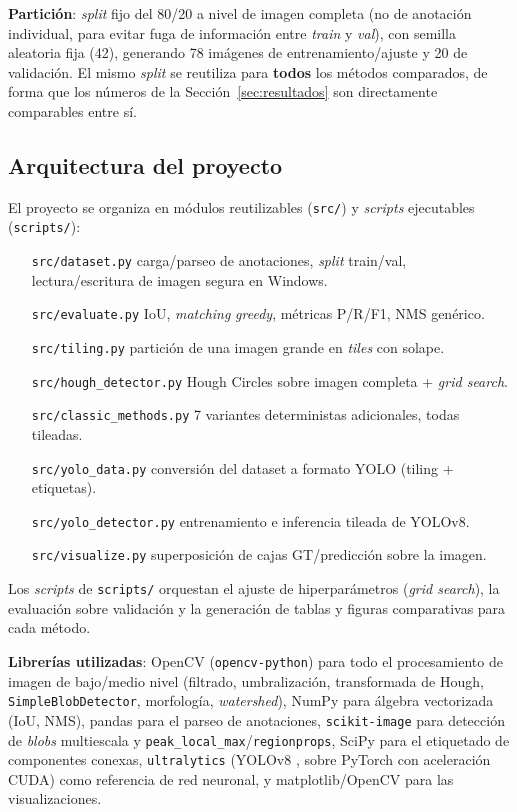 \documentclass[11pt,a4paper]{article}
\begin{document}
\textbf{Partición}: \emph{split} fijo del 80/20 a nivel de imagen completa (no de
anotación individual, para evitar fuga de información entre \emph{train} y
\emph{val}), con semilla aleatoria fija (42), generando 78 imágenes de
entrenamiento/ajuste y 20 de validación. El mismo \emph{split} se reutiliza para
\textbf{todos} los métodos comparados, de forma que los números de la
Sección~\ref{sec:resultados} son directamente comparables entre sí.

\subsection{Arquitectura del proyecto}

El proyecto se organiza en módulos reutilizables (\texttt{src/}) y \emph{scripts}
ejecutables (\texttt{scripts/}):

\begin{itemize}[leftmargin=2.2cm]
    \item[\texttt{src/dataset.py}] carga/parseo de anotaciones, \emph{split}
    train/val, lectura/escritura de imagen segura en Windows.
    \item[\texttt{src/evaluate.py}] IoU, \emph{matching} \emph{greedy}, métricas
    P/R/F1, NMS genérico.
    \item[\texttt{src/tiling.py}] partición de una imagen grande en \emph{tiles} con
    solape.
    \item[\texttt{src/hough\_detector.py}] Hough Circles sobre imagen completa +
    \emph{grid search}.
    \item[\texttt{src/classic\_methods.py}] 7 variantes deterministas adicionales,
    todas tileadas.
    \item[\texttt{src/yolo\_data.py}] conversión del dataset a formato YOLO (tiling +
    etiquetas).
    \item[\texttt{src/yolo\_detector.py}] entrenamiento e inferencia tileada de
    YOLOv8.
    \item[\texttt{src/visualize.py}] superposición de cajas GT/predicción sobre la
    imagen.
\end{itemize}

Los \emph{scripts} de \texttt{scripts/} orquestan el ajuste de hiperparámetros
(\emph{grid search}), la evaluación sobre validación y la generación de tablas y
figuras comparativas para cada método.

\textbf{Librerías utilizadas}: OpenCV (\texttt{opencv-python}) para todo el
procesamiento de imagen de bajo/medio nivel (filtrado, umbralización, transformada de
Hough, \texttt{SimpleBlobDetector}, morfología, \emph{watershed}), NumPy para álgebra
vectorizada (IoU, NMS), pandas para el parseo de anotaciones, \texttt{scikit-image}
\cite{vanderwalt2014scikit} para detección de \emph{blobs} multiescala y
\texttt{peak\_local\_max}/\texttt{regionprops}, SciPy para el etiquetado de
componentes conexas, \texttt{ultralytics} (YOLOv8 \cite{yolov8}, sobre PyTorch con
aceleración CUDA) como referencia de red neuronal, y matplotlib/OpenCV
\cite{bradski2000opencv} para las visualizaciones.
\end{document}
